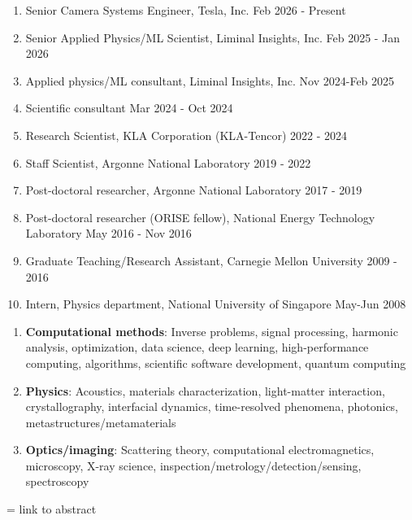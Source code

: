\documentclass[10pt]{article}
\begin{document}
\begin{enumerate}
    \item Senior Camera Systems Engineer, Tesla, Inc. \hfill Feb 2026 - Present
    \item Senior Applied Physics/ML Scientist, Liminal Insights, Inc. \hfill Feb 2025 - Jan 2026
    \item Applied physics/ML consultant, Liminal Insights, Inc. \hfill Nov 2024-Feb 2025
    \item Scientific consultant \hfill Mar 2024 - Oct 2024
    \item Research Scientist, KLA Corporation (KLA-Tencor) \hfill 2022 - 2024
    \item Staff Scientist, Argonne National Laboratory \hfill 2019 - 2022
    \item Post-doctoral researcher, Argonne National Laboratory \hfill 2017 - 2019
    \item Post-doctoral researcher (ORISE fellow), National Energy Technology Laboratory  \hfill May 2016 - Nov 2016
    \item Graduate Teaching/Research Assistant, Carnegie Mellon University \hfill 2009 - 2016
    \item Intern, Physics department, National University of Singapore \hfill May-Jun 2008 
\end{enumerate} 

\begin{enumerate}
    \item \textbf{Computational methods}: Inverse problems, signal processing, harmonic analysis, optimization, data science, deep learning, high-performance computing, algorithms, scientific software development, quantum computing
    \item \textbf{Physics}: Acoustics, materials characterization, light-matter interaction, crystallography, interfacial dynamics, time-resolved phenomena, photonics, metastructures/metamaterials
    \item \textbf{Optics/imaging}: Scattering theory, computational electromagnetics, microscopy, X-ray science, inspection/metrology/detection/sensing, spectroscopy 
\end{enumerate} 

 = link to abstract
\end{document}
